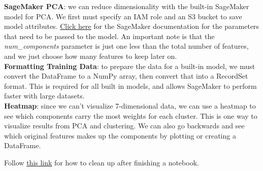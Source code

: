 \documentclass[11pt, a4paper]{article}
\begin{document}
\begin{spacing}{1.1}
	\textbf{SageMaker PCA}: we can reduce dimensionality with the built-in SageMaker model for PCA. We first must specify an IAM role and an S3 bucket to save model attributes. \href{https://sagemaker.readthedocs.io/en/latest/pca.html}{Click here} for the SageMaker documentation for the parameters that need to be passed to the model. An important note is that the \textit{num\_components} parameter is just one less than the total number of features, and we just choose how many features to keep later on. \vspace*{2mm}\\
	\textbf{Formatting Training Data}: to prepare the data for a built-in model, we must convert the DataFrame to a NumPy array, then convert that into a RecordSet format. This is required for all built in models, and allows SageMaker to perform faster with large datasets.\vspace*{2mm}\\
	\textbf{Heatmap}: since we can't visualize 7-dimensional data, we can use a heatmap to see which components carry the most weights for each cluster. This is one way to visualize results from PCA and clustering. We can also go backwards and see which original features makes up the components by plotting or creating a DataFrame. \vspace*{2mm}
	\begin{center}
	Follow \href{https://docs.aws.amazon.com/sagemaker/latest/dg/ex1-cleanup.html}{this link} for how to clean up after finishing a notebook.	
	\end{center}


\end{spacing}
\end{document}
